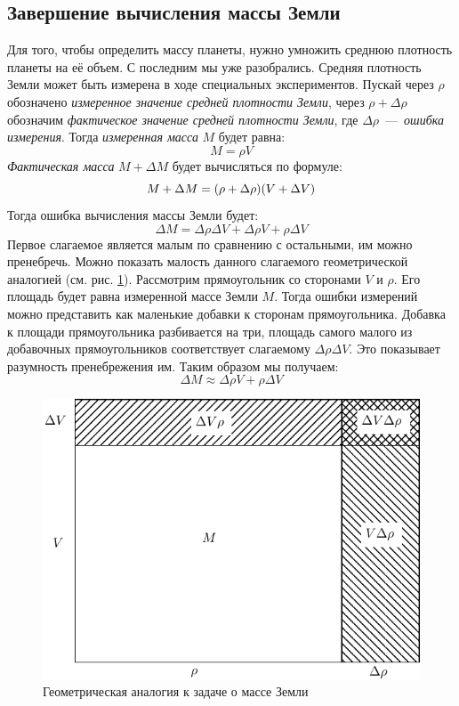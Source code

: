\documentclass[a4paper,9pt,russian]{article}
\begin{document}
\subsection{Завершение вычисления массы Земли}
Для того, чтобы определить массу планеты, нужно умножить среднюю плотность планеты на её объем. С последним мы уже разобрались. Средняя плотность Земли может быть измерена в ходе специальных экспериментов. Пускай через $\rho$ обозначено \emph{измеренное значение средней плотности Земли}, через $\rho + \Delta \rho$ обозначим \emph{фактическое значение средней плотности Земли}, где $\Delta \rho$~\----~\emph{ошибка измерения}. Тогда \emph{измеренная масса} $M$ будет равна:
\begin{equation}
 M = \rho V
\end{equation}
\emph{Фактическая масса} $M + \Delta M$ будет вычисляться по формуле:
\begin{equation}
 M + \Delta M = \qty(\rho + \Delta \rho) \qty(V + \Delta V)
\end{equation}
Тогда ошибка вычисления массы Земли будет:
\begin{equation}
 \Delta M = \Delta \rho \Delta V + \Delta \rho V + \rho \Delta V 
\end{equation}
Первое слагаемое является малым по сравнению с остальными, им можно пренебречь. Можно показать малость данного слагаемого геометрической аналогией (см. рис. \ref{fig:5}). Рассмотрим прямоугольник со сторонами $V$ и $\rho$. Его площадь будет равна измеренной массе Земли $M$. Тогда ошибки измерений можно представить как маленькие добавки к сторонам прямоугольника. Добавка к площади прямоугольника разбивается на три, площадь самого малого из добавочных прямоугольников соответствует слагаемому $\Delta \rho \Delta V$. Это показывает разумность пренебрежения им. Таким образом мы получаем:
\begin{equation}\label{eq:14}
 \Delta M \approx \Delta \rho V + \rho \Delta V 
\end{equation}
\begin{figure}[h]
 \centering
 \includegraphics[scale = 0.8]{first4.pdf}
 \caption{Геометрическая аналогия к задаче о массе Земли}
 \label{fig:5}
\end{figure}
\end{document}
